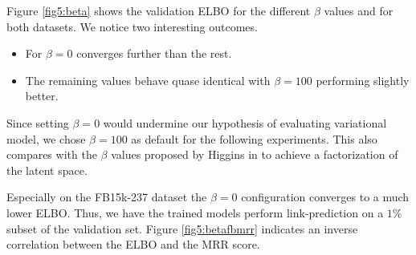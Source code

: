 Figure \ref{fig5:beta} shows the validation ELBO for the different $\beta$ values and for both datasets. We notice two interesting outcomes.  

\begin{itemize}
    \item For $\beta = 0$ converges further than the rest.
    \item The remaining values behave quase identical with $\beta = 100$ performing slightly better. 
\end{itemize}

Since setting $\beta = 0$ would undermine our hypothesis of evaluating variational model, we chose $\beta = 100$ as default for the following experiments. This also compares with the $\beta$ values proposed by Higgins in \cite{higgins_beta-vae_2016} to achieve a factorization of the latent space.

Especially on the FB15k-237 dataset the $\beta = 0$ configuration converges to a much lower ELBO. Thus, we have the trained models perform link-prediction on a $1\%$ subset of the validation set. Figure \ref{fig5:betafbmrr} indicates an inverse correlation between the ELBO and the MRR score. 





